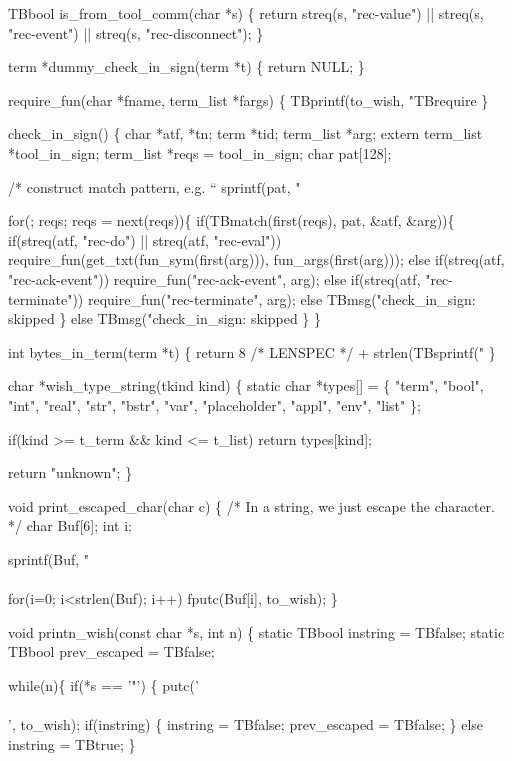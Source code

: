 TBbool is_from_tool_comm(char *s)
\{
  return streq(s, "rec-value") ||  streq(s, "rec-event") || streq(s, "rec-disconnect");
\}

term *dummy_check_in_sign(term *t)
\{
  return NULL;
\}

require_fun(char *fname, term_list *fargs)
\{
  TBprintf(to_wish, "TBrequire %
\}

check_in_sign()
\{ char *atf, *tn;
  term *tid;
  term_list *arg;
  extern term_list *tool_in_sign;
  term_list *reqs = tool_in_sign;
  char pat[128];

  /* construct match pattern, e.g. ``%
  sprintf(pat, "%

  for(; reqs; reqs = next(reqs))\{
    if(TBmatch(first(reqs), pat, &atf, &arg))\{
        if(streq(atf, "rec-do") || streq(atf, "rec-eval"))
          require_fun(get_txt(fun_sym(first(arg))), fun_args(first(arg)));
        else if(streq(atf, "rec-ack-event"))
          require_fun("rec-ack-event", arg);
        else if(streq(atf, "rec-terminate"))
          require_fun("rec-terminate", arg);
        else
          TBmsg("check_in_sign: skipped %
  \} else
        TBmsg("check_in_sign: skipped %
  \}
\}

int bytes_in_term(term *t)
\{
  return 8 /* LENSPEC */ + strlen(TBsprintf("%
\}

char *wish_type_string(tkind kind)
\{
  static char *types[] =
    \{ "term", "bool", "int", "real", "str", "bstr", "var",
      "placeholder", "appl", "env", "list"
    \};

  if(kind >= t_term && kind <= t_list)
    return types[kind];

  return "unknown";
\}

void print_escaped_char(char c)
\{
  /* In a string, we just escape the character. */
  char Buf[6];
  int i;
  
  sprintf(Buf, "\\\\%
  for(i=0; i<strlen(Buf); i++)
    fputc(Buf[i], to_wish);
\}

void printn_wish(const char *s, int n)
\{
  static TBbool instring = TBfalse;
  static TBbool prev_escaped = TBfalse;

  while(n)\{
    if(*s == '"') \{
      putc('\\\\', to_wish);
      if(instring)
        \{
          instring = TBfalse;
          prev_escaped = TBfalse;
        \}
      else
        instring = TBtrue;
    \}

